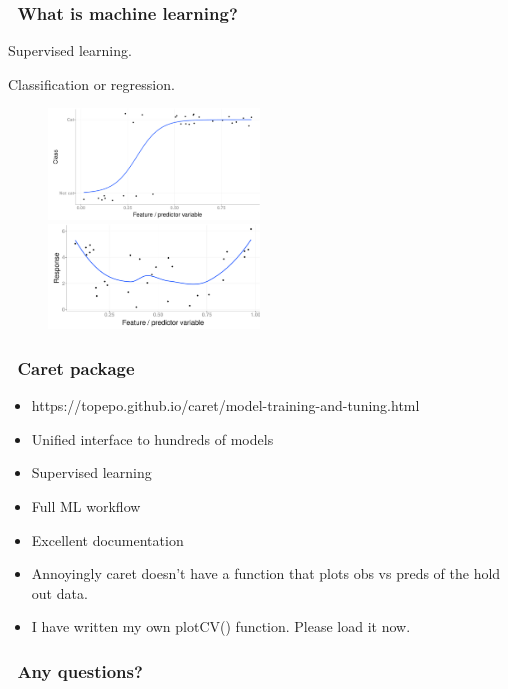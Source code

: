 \documentclass[handout, aspectratio = 169]{beamer}
\begin{document}
\begin{frame}
\frametitle{\insertframenumber~What is machine learning?}
Supervised learning.

Classification or regression.
\begin{figure}
    \includegraphics[width = 0.5\textwidth]{classification}%
    \includegraphics[width = 0.5\textwidth]{regression}
\end{figure} 

\end{frame} 


\begin{frame}
\frametitle{\insertframenumber~Caret package}
\begin{itemize}
\item https://topepo.github.io/caret/model-training-and-tuning.html
\item Unified interface to hundreds of models
\item Supervised learning
\item Full ML workflow
\item Excellent documentation
\item Annoyingly caret doesn't have a function that plots obs vs preds of the hold out data.
\item I have written my own plotCV() function. Please load it now.

\end{itemize}

\end{frame} 



\begin{frame}
\frametitle{\insertframenumber~Any questions?}


\end{frame} 
\end{document}
